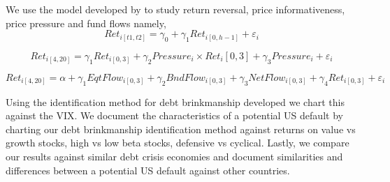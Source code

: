 \documentclass[
  12pt]{article}
\begin{document}
We use the model developed by \citet{boguth} to study return reversal,
price informativeness, price pressure and fund flows namely,
\[Ret_{i[t1,t2]} = γ_0 +γ_1Ret_{i[0,h−1]} + ε_i \]

\[ Ret_{i[4,20]} = γ_1Ret_{i[0,3]} + γ_2P ressure_i × Ret_i[0,3] + γ_3Pressure_i + ε_i \]

\[ Ret_{i[4,20]} = α + γ_1EqtFlow_{i[0,3]} + γ_2BndFlow_{i[0,3]} + γ_3NetFlow_{i[0,3]} + γ_4Ret_{i[0,3]} + ε_i \]

Using the identification method for debt brinkmanship developed we chart
this against the VIX. We document the characteristics of a potential US
default by charting our debt brinkmanship identification method against
returns on value vs growth stocks, high vs low beta stocks, defensive vs
cyclical. Lastly, we compare our results against similar debt crisis
economies and document similarities and differences between a potential
US default against other countries.

\hypertarget{section}{%
\subsection{}\label{section}}


  
\end{document}
